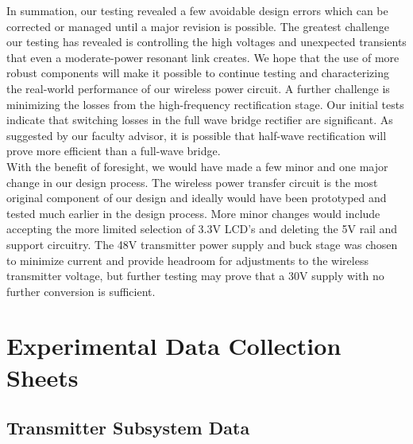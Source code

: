 \documentclass[12pt]{article}
\begin{document}
\indent
In summation, our testing revealed a few avoidable design errors which can be corrected or managed until a major revision is possible. The greatest challenge our testing has revealed is controlling the high voltages and unexpected transients that even a moderate-power resonant link creates. We hope that the use of more robust components will make it possible to continue testing and characterizing the real-world performance of our wireless power circuit. A further challenge is minimizing the losses from the high-frequency rectification stage. Our initial tests indicate that switching losses in the full wave bridge rectifier are significant. As suggested by our faculty advisor, it is possible that half-wave rectification will prove more efficient than a full-wave bridge.\\

\indent
With the benefit of foresight, we would have made a few minor and one major change in our design process. The wireless power transfer circuit is the most original component of our design and ideally would have been prototyped and tested much earlier in the design process. More minor changes would include accepting the more limited selection of 3.3V LCD’s and deleting the 5V rail and support circuitry. The 48V transmitter power supply and buck stage was chosen to minimize current and provide headroom for adjustments to the wireless transmitter voltage, but further testing may prove that a 30V supply with no further conversion is sufficient.
\hfill 
\pagebreak




%
%
\section{Experimental Data Collection Sheets}

\subsection{Transmitter Subsystem Data}
\end{document}
